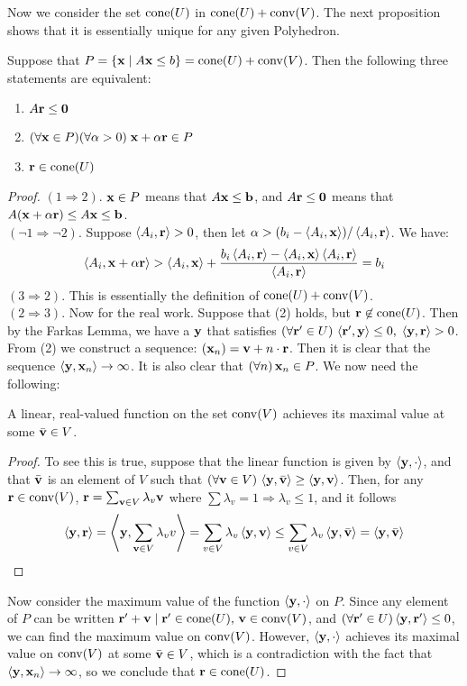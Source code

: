 Now we consider the set $\cone(U)$ in $\cone(U) + \conv(V)$.  The next proposition shows that it is essentially unique for any given Polyhedron.

\begin{Prop}\label{characteristic_cone}
	Suppose that $P = \HP{A}{b} = \VP{U}{V}$.  Then the following three statements are equivalent:
	\begin{enumerate}
		\item $A\r\leq\0$
		\item $(\forall \x\in P)(\forall \alpha > 0)\;\x + \alpha\r \in P$
		\item $\r \in \cone(U)$
	\end{enumerate}
\end{Prop}

\begin{proof}
	$(1 \Rightarrow 2)$. $\x\in P$ means that $A\x\leq\b$, and $A\r\leq\0$ means that $A(\x+\alpha\r) \leq A\x \leq \b$.\\
	$(\neg 1 \Rightarrow \neg 2)$.  Suppose $\ip{A_i}{\r} > 0$, then let $\alpha > (b_i - \ip{A_i}{\x})/\ip{A_i}{\r}$.  We have:
	\[ \ip{A_i}{\x + \alpha\r} > \ip{A_i}{\x} +
		\frac{b_i\ip{A_i}{\r} - \ip{A_i}{\x}\ip{A_i}{\r}}{\ip{A_i}{\r}} = b_i \]
	$(3 \Rightarrow 2)$.  This is essentially the definition of $\VP{U}{V}$.\\
	$(2 \Rightarrow 3)$.  Now for the real work.  Suppose that (2) holds, but $\r\not\in\cone(U)$.  Then by the Farkas Lemma, we have a $\y$ that satisfies $(\forall \r'\in U)\,\ip{\r'}{\y}\leq 0,\; \ip{\y}{\r} > 0$.  From (2) we construct a sequence: $(\x_n) = \v+n\cdot\r$.  Then it is clear that the sequence $\ip{\y}{\x_n} \to \infty$.  It is also clear that $(\forall n)\,\x_n \in P$.  We now need the following:
	\begin{Prop}\label{max_linear_func}
		A linear, real-valued function on the set $\conv(V)$ achieves its maximal value at some $\bar\v \in V$.
	\end{Prop}
	\begin{proof}
		To see this is true, suppose that the linear function is given by $\ip{\y}{\cdot}$, and that $\bar\v$ is an element of $V$ such that $(\forall \v \in V)\,\ip{\y}{\bar\v} \geq \ip{\y}{\v}$.  Then, for any $\r \in \conv(V)$, $\r = \sum_{\v\in V} \lambda_v\v$ where $\sum \lambda_v = 1 \Rightarrow \lambda_v \leq 1$, and it follows
		\[\ip{\y}{\r} = \ip{\y}{\sum_{\v\in V}\lambda_v v} = \sum_{v\in V} \lambda_v\ip{\y}{\v}
			\leq \sum_{v\in V}\lambda_v\ip{\y}{\bar\v} = \ip{\y}{\bar\v} \]
	\end{proof}
	Now consider the maximum value of the function $\ip{\y}{\cdot}$ on $P$.  Since any element of $P$ can be written $\r' + \v \st \r'\in\cone(U),\,\v\in\conv(V)$, and $(\forall\r'\in U) \ip{\y}{\r'} \leq 0$, we can find the maximum value on $\conv(V)$.  However, $\ip{\y}{\cdot}$ achieves its maximal value on $\conv(V)$ at some $\bar\v\in V$, which is a contradiction with the fact that $\ip{\y}{\x_n} \to \infty$, so we conclude that $\r\in\cone(U)$.
\end{proof}

